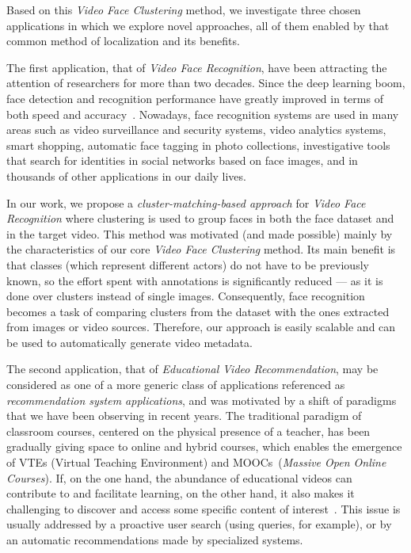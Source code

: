 Based on this \emph{Video Face Clustering} method, we investigate three chosen applications in which we explore novel approaches, all of them enabled by that common method of localization and its benefits. 

The first application, that of \emph{Video Face Recognition}, have been attracting the attention of researchers for more than two decades. Since the deep learning boom, face detection and recognition performance have greatly improved in terms of both speed and accuracy~\cite{masi2018deep}. Nowadays, face recognition systems are used in many areas such as video surveillance and security systems, video analytics systems, smart shopping, automatic face tagging in photo collections, investigative tools that search for identities in social networks based on face images, and in thousands of other applications in our daily lives.

In our work, we propose a \textit{cluster-matching-based approach} for \emph{Video Face Recognition} where clustering is used to group faces in both the face dataset and in the target video. This method was motivated (and made possible) mainly by the characteristics of our core \emph{Video Face Clustering} method. Its main benefit is that classes (which represent different actors) do not have to be previously known, so the effort spent with annotations is significantly reduced --- as it is done over clusters instead of single images. Consequently, face recognition becomes a task of comparing clusters from the dataset with the ones extracted from images or video sources. Therefore, our approach is easily scalable and can be used to automatically generate video metadata.

The second application, that of \emph{Educational Video Recommendation}, may be considered as one of a more generic class of applications referenced as \textit{recommendation system applications}, and was motivated by a shift of paradigms that we have been observing in recent years. The traditional paradigm of classroom courses, centered on the physical presence of a teacher, has been gradually giving space to online and hybrid courses, which enables the emergence of VTEs (Virtual Teaching Environment) and MOOCs~(\textit{Massive Open Online Courses}).
If, on the one hand, the abundance of educational videos can contribute to and facilitate learning, on the other hand, it also makes it challenging to discover and access some specific content of interest~\cite{dias2017approach}.
This issue is usually addressed by a proactive user search (using queries, for example), or by an automatic recommendations made by specialized systems.



